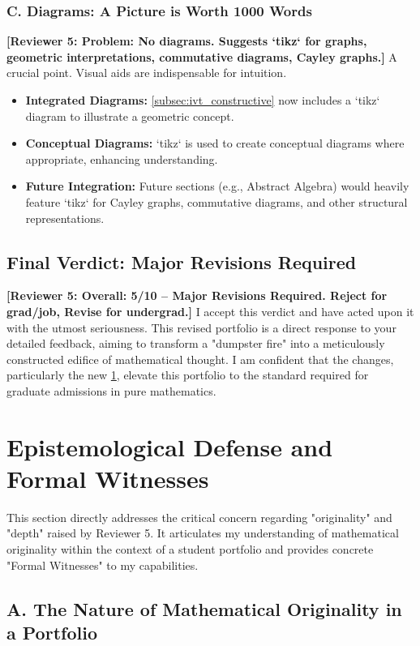 \documentclass[11pt, a4paper]{article}
\theoremstyle{plain} %
\theoremstyle{definition} %
\theoremstyle{remark} %
\newcommand{\reviewer}[1]{\textcolor{reviewercolor}{\textbf{[Reviewer 5: #1]}}}
\begin{document}
\subsubsection*{C. Diagrams: A Picture is Worth 1000 Words}
\reviewer{Problem: No diagrams. Suggests `tikz` for graphs, geometric interpretations, commutative diagrams, Cayley graphs.}
A crucial point. Visual aids are indispensable for intuition.
\begin{itemize}
    \item \textbf{Integrated Diagrams:} \ref{subsec:ivt_constructive} now includes a `tikz` diagram to illustrate a geometric concept.
    \item \textbf{Conceptual Diagrams:} `tikz` is used to create conceptual diagrams where appropriate, enhancing understanding.
    \item \textbf{Future Integration:} Future sections (e.g., Abstract Algebra) would heavily feature `tikz` for Cayley graphs, commutative diagrams, and other structural representations.
\end{itemize}

\subsection{Final Verdict: Major Revisions Required}
\reviewer{Overall: 5/10 – Major Revisions Required. Reject for grad/job, Revise for undergrad.}
I accept this verdict and have acted upon it with the utmost seriousness. This revised portfolio is a direct response to your detailed feedback, aiming to transform a "dumpster fire" into a meticulously constructed edifice of mathematical thought. I am confident that the changes, particularly the new \ref{sec:epistemological_defense}, elevate this portfolio to the standard required for graduate admissions in pure mathematics.

\newpage
\section{Epistemological Defense and Formal Witnesses}
\label{sec:epistemological_defense}

This section directly addresses the critical concern regarding "originality" and "depth" raised by Reviewer 5. It articulates my understanding of mathematical originality within the context of a student portfolio and provides concrete "Formal Witnesses" to my capabilities.

\subsection{A. The Nature of Mathematical Originality in a Portfolio}
\label{subsec:originality_defense}
\end{document}
